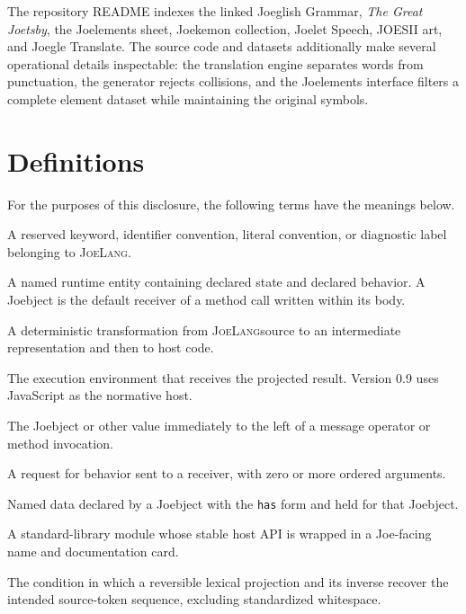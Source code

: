 \documentclass[12pt]{article}
\newcommand{\JoeLang}{\textsc{JoeLang}}
\begin{document}
The repository README indexes the linked Joeglish Grammar, \emph{The Great Joetsby}, the Joelements sheet, Joekemon collection, Joelet Speech, JOESII art, and Joegle Translate.\cite{joelibReadme} The source code and datasets additionally make several operational details inspectable: the translation engine separates words from punctuation, the generator rejects collisions, and the Joelements interface filters a complete element dataset while maintaining the original symbols.\cite{translatorSource,translatorEngine,joelements}

\clearpage
\section{Definitions}
For the purposes of this disclosure, the following terms have the meanings below.

\begin{description}[style=nextline,leftmargin=2.9cm,font=\normalfont\bfseries]
  \item[Joe token] A reserved keyword, identifier convention, literal convention, or diagnostic label belonging to \JoeLang.
  \item[Joebject] A named runtime entity containing declared state and declared behavior. A Joebject is the default receiver of a method call written within its body.
  \item[Projection] A deterministic transformation from \JoeLang source to an intermediate representation and then to host code.
  \item[Host] The execution environment that receives the projected result. Version 0.9 uses JavaScript as the normative host.
  \item[Receiver] The Joebject or other value immediately to the left of a message operator or method invocation.
  \item[Message] A request for behavior sent to a receiver, with zero or more ordered arguments.
  \item[State] Named data declared by a Joebject with the \texttt{has} form and held for that Joebject.
  \item[Joelement] A standard-library module whose stable host API is wrapped in a Joe-facing name and documentation card.
  \item[Round trip] The condition in which a reversible lexical projection and its inverse recover the intended source-token sequence, excluding standardized whitespace.
\end{description}
\end{document}
